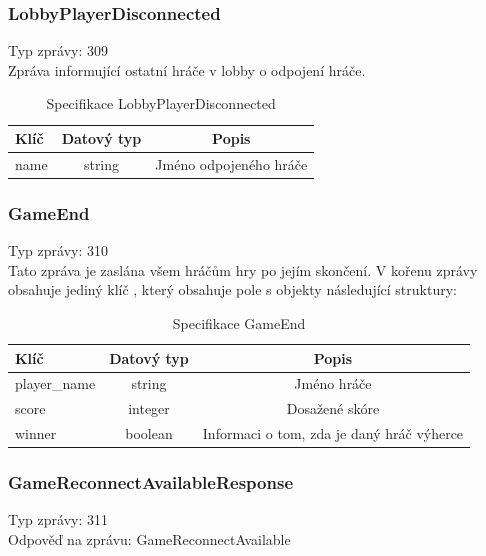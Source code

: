 \documentclass[12pt, a4paper]{article}
\begin{document}
    \subsubsection*{LobbyPlayerDisconnected}
    Typ zprávy: 309\\

    Zpráva informující ostatní hráče v lobby o odpojení hráče.

    \begin{table}[H]
        \centering
        \begin{tabular}{|l|c|c|}
            \hline
            Klíč & Datový typ & Popis\\
            \hline
            \hline
            name & string & Jméno odpojeného hráče\\
            \hline
        \end{tabular}
        \caption{Specifikace LobbyPlayerDisconnected}
    \end{table}

    \subsubsection*{GameEnd}
    Typ zprávy: 310\\

    Tato zpráva je zaslána všem hráčům hry po jejím skončení.
    V kořenu zprávy obsahuje jediný klíč , který obsahuje pole s objekty následující struktury:

    \begin{table}[H]
        \centering
        \begin{tabular}{|l|c|c|}
            \hline
            Klíč & Datový typ & Popis\\
            \hline
            \hline
            player\_name & string & Jméno hráče\\
            \hline
            score & integer & Dosažené skóre\\
            \hline
            winner & boolean & Informaci o tom, zda je daný hráč výherce\\
            \hline
        \end{tabular}
        \caption{Specifikace GameEnd}
    \end{table}

    \subsubsection*{GameReconnectAvailableResponse}
    Typ zprávy: 311\\
    Odpověď na zprávu: GameReconnectAvailable\\
\end{document}
